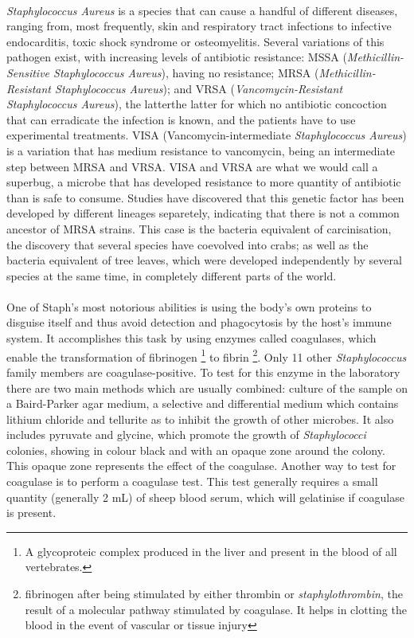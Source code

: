 \paragraph{}\emph{Staphylococcus Aureus} is a species that can cause a handful of different diseases, ranging from, most frequently, skin and respiratory tract infections to infective endocarditis, toxic shock syndrome or osteomyelitis. Several variations of this pathogen exist, with increasing levels of antibiotic resistance: MSSA (\emph{Methicillin-Sensitive Staphylococcus Aureus}), having no resistance; MRSA (\emph{Methicillin-Resistant Staphylococcus Aureus}); and VRSA (\emph{Vancomycin-Resistant \emph{Staphylococcus Aureus}}), the latterthe latter for which no antibiotic concoction that can erradicate the infection is known, and the patients have to use experimental treatments. VISA (Vancomycin-intermediate \emph{Staphylococcus Aureus}) is a variation that has medium resistance to vancomycin, being an intermediate step between MRSA and VRSA. VISA and VRSA are what we would call a superbug, a microbe that has developed resistance to more quantity of antibiotic than is safe to consume. Studies have discovered that this genetic factor has been developed by different lineages separetely, indicating that there is not a common ancestor of MRSA strains. This case is the bacteria equivalent of carcinisation, the discovery that several species have coevolved into crabs; as well as the bacteria equivalent of tree leaves, which were developed independently by several species at the same time, in completely different parts of the world. 
\paragraph{}One of Staph's most notorious abilities is using the body's own proteins to disguise itself and thus avoid detection and phagocytosis by the host's immune system. It accomplishes this task by using enzymes called coagulases, which enable the transformation of fibrinogen \footnote{A glycoproteic complex produced in the liver and present in the blood of all vertebrates.} to fibrin \footnote{fibrinogen after being stimulated by either thrombin or \emph{staphylothrombin}, the result of a molecular pathway stimulated by coagulase. It helps in clotting the blood in the event of vascular or tissue injury}\cite{murrayMicrobiologiaMedica2013}. Only 11 other \emph{Staphylococcus} family members are coagulase-positive. To test for this enzyme in the laboratory there are two main methods which are usually combined: culture of the sample on a Baird-Parker agar medium, a selective and differential medium which contains lithium chloride and tellurite as to inhibit the growth of other microbes. It also includes pyruvate and glycine, which promote the growth of \emph{Staphylococci} colonies, showing in colour black and with an opaque zone around the colony. This opaque zone represents the effect of the coagulase. Another way to test for coagulase is to perform a coagulase test. This test generally requires a small quantity (generally 2 mL) of sheep blood serum, which will gelatinise if coagulase is present.
